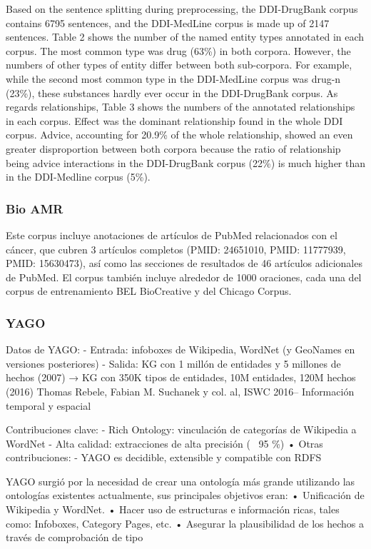 Based on the sentence splitting during preprocessing, the DDI-DrugBank corpus contains 6795 sentences, and the DDI-MedLine corpus is made up of 2147 sentences. Table 2 shows the number of the named entity types annotated in each corpus. The most common type was drug (63\%) in both corpora. However, the numbers of other types of entity differ between both sub-corpora. For example, while the second most common type in the DDI-MedLine corpus was drug-n (23\%), these substances hardly ever occur in the DDI-DrugBank corpus. As regards relationships, Table 3 shows the numbers of the annotated relationships in each corpus. Effect was the dominant relationship found in the whole DDI corpus. Advice, accounting for 20.9\% of the whole relationship, showed an even greater disproportion between both corpora because the ratio of relationship being advice interactions in the DDI-DrugBank corpus (22\%) is much higher than in the DDI-Medline corpus (5\%).

\subsubsection*{Bio AMR}

Este corpus incluye anotaciones de artículos de PubMed relacionados con el cáncer, que cubren 3 artículos completos (PMID: 24651010, PMID: 11777939, PMID: 15630473), así como las secciones de resultados de 46 artículos adicionales de PubMed. El corpus también incluye alrededor de 1000 oraciones, cada una del corpus de entrenamiento BEL BioCreative y del Chicago Corpus.

\subsubsection*{YAGO}

Datos de YAGO: - Entrada: infoboxes de Wikipedia, WordNet (y GeoNames en versiones posteriores) - Salida: KG con 1 millón de entidades y 5 millones de hechos (2007) → KG con 350K tipos de entidades, 10M entidades, 120M hechos (2016) Thomas Rebele, Fabian M. Suchanek y col. al, ISWC 2016– Información temporal y espacial

Contribuciones clave: - Rich Ontology: vinculación de categorías de Wikipedia a WordNet - Alta calidad: extracciones de alta precisión (~ 95 \%) • Otras contribuciones: - YAGO es decidible, extensible y compatible con RDFS

YAGO surgió por la necesidad de crear una ontología más grande utilizando las ontologías existentes actualmente, sus principales objetivos eran: • Unificación de Wikipedia y WordNet. • Hacer uso de estructuras e información ricas, tales como: Infoboxes, Category Pages, etc. • Asegurar la plausibilidad de los hechos a través de comprobación de tipo

